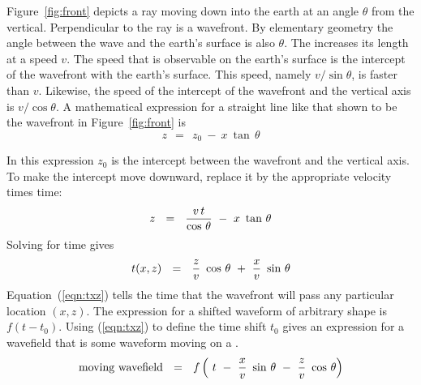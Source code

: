 Figure~\ref{fig:front} depicts a ray moving down into the earth
at an angle $ \theta $ from the vertical.
Perpendicular to the ray is a wavefront.
By elementary geometry the angle between the wave
and the earth's surface
is also  $ \theta $.
The  increases its length at a speed  $v$.
The speed that is observable on the earth's surface is the intercept
of the wavefront with the earth's surface.
This speed, namely  $ v / \sin \theta $,  is faster than  $v$.
Likewise, the speed of the intercept of the wavefront and
the vertical axis is  $ v / \cos \theta $.
A mathematical expression for a straight line
like that shown to be the wavefront in Figure~\ref{fig:front} is
\begin{equation}
z \ \ =\ \  z_0 \ -\  x \  \tan \, \theta
\label{eqn:2.1}
\end{equation}
\par
In this expression  $ z_0 $  is the intercept between the wavefront
and the vertical axis.
To make the intercept move downward, replace it by the
appropriate velocity times time:
\begin{equation}
z \ \ =\ \  {v \, t \over  \cos \, \theta } \ -\  x \  \tan \, \theta
\label{eqn:2.2}
\end{equation}
Solving for time gives
\begin{equation}
t(x,z) \ \ =\ \  {z\over v }\ \cos\,\theta \ +\  {x \over v }\  \sin \, \theta
\label{eqn:txz}
\end{equation}
Equation~(\ref{eqn:txz}) tells the time that the wavefront will pass any
particular location  $(x , z)$.
The expression for a shifted waveform
of arbitrary shape is  $ f(t - t_0 ) $.
Using (\ref{eqn:txz}) to define the time shift $ t_0 $ gives an expression for
a wavefield that is some waveform moving on a .
\begin{equation}
\hbox{moving wavefield} \ \ =\ \
f\left( \ t\ -\  {x \over v}\ \sin\,\theta \ -\ {z\over v}\ \cos\,\theta\right)
\label{eqn:mvwv}
\end{equation}

